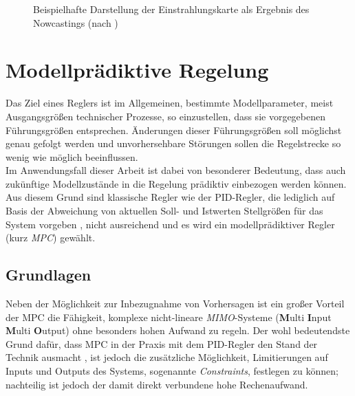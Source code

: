 \begin{figure}[h!]
    \centering
    \setlength{\fboxsep}{1pt}
    \setlength{\fboxrule}{1pt}
    \caption[Beispielhafte Darstellung der Einstrahlungskarte als Ergebnis des Nowcastings]{Beispielhafte Darstellung der Einstrahlungskarte als Ergebnis des Nowcastings (nach \cite[S.14]{Samu})}
    \label{fig_EinstrahlungNowcasting}
\end{figure}



\section{Modellprädiktive Regelung} \label{sec_ModellprädiktiveRegelung}
Das Ziel eines Reglers ist im Allgemeinen, bestimmte Modellparameter, meist Ausgangsgrößen technischer Prozesse, so einzustellen, dass sie vorgegebenen Führungsgrößen entsprechen.
Änderungen dieser Führungsgrößen soll möglichst genau gefolgt werden und unvorhersehbare Störungen sollen die Regelstrecke so wenig wie möglich beeinflussen. \cite{Abel} \\
Im Anwendungsfall dieser Arbeit ist dabei von besonderer Bedeutung, dass auch zukünftige Modellzustände in die Regelung prädiktiv einbezogen werden können.
Aus diesem Grund sind klassische Regler wie der PID-Regler, die lediglich auf Basis der Abweichung von aktuellen Soll- und Istwerten Stellgrößen für das System vorgeben \cite[S.408]{Lunze}, nicht ausreichend und es wird ein modellprädiktiver Regler (kurz \textit{MPC}) gewählt.

\subsection{Grundlagen} \label{subsec_GrundlagenMPC}
Neben der Möglichkeit zur Inbezugnahme von Vorhersagen ist ein großer Vorteil der MPC die Fähigkeit, komplexe nicht-lineare \textit{MIMO}-Systeme (\textbf{M}ulti \textbf{I}nput \textbf{M}ulti \textbf{O}utput) ohne besonders hohen Aufwand zu regeln.
Der wohl bedeutendste Grund dafür, dass MPC in der Praxis mit dem PID-Regler den Stand der Technik ausmacht \cite[S.viii]{Kouvaritakis}, ist jedoch die zusätzliche Möglichkeit, Limitierungen auf Inputs und Outputs des Systems, sogenannte \textit{Constraints}, festlegen zu können; nachteilig ist jedoch der damit direkt verbundene hohe Rechenaufwand. \cite[S.1-2]{Kouvaritakis}

